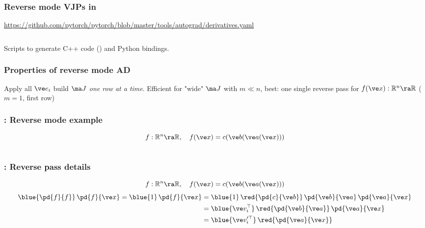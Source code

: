 \documentclass[fleqn,10pt]{beamer}
\begin{document}
\begin{frame}
    \frametitle{Reverse mode VJPs in \pytorch}
    \url{https://github.com/pytorch/pytorch/blob/master/tools/autograd/derivatives.yaml}
    \inputminted{yaml}{code/pytorch_vjp.yaml}
    Scripts to generate C++ code () and Python bindings.
\end{frame}

\begin{frame}[fragile]
    \frametitle{Properties of reverse mode AD}
    Apply all $\ve e_i$ \ra build $\ma J$ \emph{one row at a time}.
    Efficient for "wide" $\ma J$ with $m\ll n$, best: one single reverse pass for $f(\ve x): \mathbb R^n \ra \mathbb R$ ($m=1$, first row)
    \edgerow
\end{frame}

\begin{frame}[fragile]
    \frametitle{\pytorch: Reverse mode example}
    \begin{equation*}
        f: \mathbb R^n\ra \mathbb R, \quad f(\ve x) = c(\ve b(\ve a(\ve x)))
    \end{equation*}
    \inputminted[xleftmargin=.5cm]{python}{code/pytorch_fwd_rev_1.py}
\end{frame}

\begin{frame}
    \frametitle{\pytorch: Reverse pass details}
    \begin{equation*}
        f: \mathbb R^n\ra \mathbb R, \quad f(\ve x) = c(\ve b(\ve a(\ve x)))
    \end{equation*}
    \begin{align*}
        \blue{\pd{f}{f}}\,\pd{f}{\ve x} = \blue{1}\,\pd{f}{\ve x}
            &= \blue{1}\,            \red{\pd{c}{\ve b}}\,\pd{\ve b}{\ve a}\,\pd{\ve a}{\ve x}\\
            &= \blue{\ve v_i^\top}\, \red{\pd{\ve b}{\ve a}}\,\pd{\ve a}{\ve x}\\
            &= \blue{\ve v_i'^\top}\,\red{\pd{\ve a}{\ve x}}
    \end{align*}
\end{frame}
\end{document}
